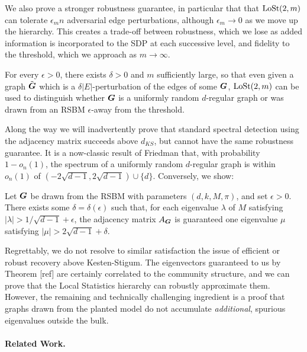 We also prove a stronger robustness guarantee, in particular that that $\operatorname{LoSt}(2,m)$ can tolerate $\epsilon_m n$ adversarial edge perturbations, although $\epsilon_m \to 0$ as we move up the hierarchy. This creates a trade-off between robustness, which we lose as added information is incorporated to the SDP at each successive level, and fidelity to the threshold, which we approach as $m\to\infty$.

\begin{theorem}
For every $\epsilon > 0$, there exists $\delta > 0$ and $m$ sufficiently large, so that even given a graph $\tilde{\boldsymbol{G}}$ which is a $\delta|E|$-perturbation of the edges of some $\boldsymbol{G}$, $\operatorname{LoSt}(2,m)$ can be used to distinguish whether $\boldsymbol{G}$ is a uniformly random $d$-regular graph or was drawn from an RSBM $\epsilon$-away from the threshold.
\end{theorem}

Along the way we will inadvertently prove that standard spectral detection using the adjacency matrix succeeds above $d_{KS}$, but cannot have the same robustness guarantee. It is a now-classic result of Friedman that, with probability $1 - o_n(1)$, the spectrum of a uniformly random $d$-regular graph is within $o_n(1)$ of $(-2\sqrt{d-1},2\sqrt{d-1})\cup\{d\}$. Conversely, we show:

\begin{corollary}
	Let $\boldsymbol{G}$ be drawn from the RSBM with parameters $(d,k,M,\pi)$, and set $\epsilon > 0$. There exists some $\delta = \delta(\epsilon)$ such that, for each eigenvalue $\lambda$ of $M$ satisfying $|\lambda| > 1/\sqrt{d-1} + \epsilon$, the adjacency matrix $A_{\boldsymbol{G}}$  is guaranteed one eigenvalue $\mu$ satisfying $|\mu| > 2\sqrt{d-1} + \delta$.
\end{corollary}

Regrettably, we do not resolve to similar satisfaction the issue of efficient or robust recovery above Kesten-Stigum. The eigenvectors guaranteed to us by Theorem [ref] are certainly correlated to the community structure, and we can prove that the Local Statistics hierarchy can robustly approximate them. However, the remaining and technically challenging ingredient is a proof that graphs drawn from the planted model do not accumulate \emph{additional}, spurious eigenvalues outside the bulk.

\paragraph{Related Work.}


